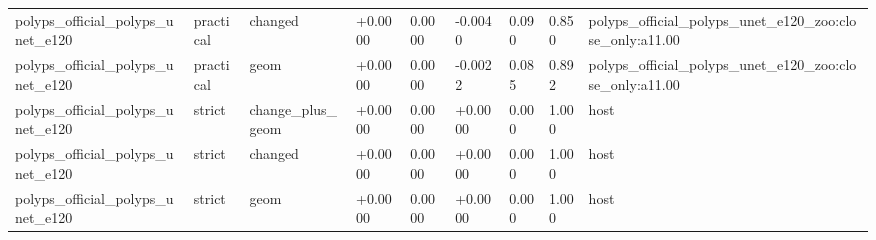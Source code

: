 \begin{table}[t]
\begin{tabular}{lllllllll}
polyps\_official\_polyps\_unet\_e120 & practical & changed & +0.0000 & 0.0000 & -0.0040 & 0.090 & 0.850 & polyps\_official\_polyps\_unet\_e120\_zoo:close\_only:a11.00 \\
polyps\_official\_polyps\_unet\_e120 & practical & geom & +0.0000 & 0.0000 & -0.0022 & 0.085 & 0.892 & polyps\_official\_polyps\_unet\_e120\_zoo:close\_only:a11.00 \\
polyps\_official\_polyps\_unet\_e120 & strict & change\_plus\_geom & +0.0000 & 0.0000 & +0.0000 & 0.000 & 1.000 & host \\
polyps\_official\_polyps\_unet\_e120 & strict & changed & +0.0000 & 0.0000 & +0.0000 & 0.000 & 1.000 & host \\
polyps\_official\_polyps\_unet\_e120 & strict & geom & +0.0000 & 0.0000 & +0.0000 & 0.000 & 1.000 & host \\
\bottomrule
\end{tabular}
\end{table}
